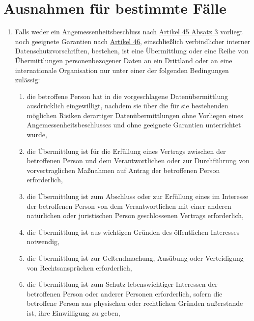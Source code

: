 \chapter{Ausnahmen für bestimmte Fälle}
\label{ch:49}


\begin{enumerate}

  \item Falls weder ein Angemessenheitsbeschluss nach \hyperref[itm:45-3]{Artikel 45 Absatz 3} vorliegt noch geeignete
   Garantien nach \hyperref[ch:46]{Artikel 46}, einschließlich verbindlicher interner Datenschutzvorschriften,
   bestehen, ist eine Übermittlung oder eine Reihe von Übermittlungen personenbezogener Daten an ein Drittland oder an
   eine internationale Organisation nur unter einer der folgenden Bedingungen zulässig:
  \label{itm:49-1-1}

  \begin{enumerate}
  
    \item die betroffene Person hat in die vorgeschlagene Datenübermittlung ausdrücklich eingewilligt, nachdem sie über
     die für sie bestehenden möglichen Risiken derartiger Datenübermittlungen ohne Vorliegen eines
     Angemessenheitsbeschlusses und ohne geeignete Garantien unterrichtet wurde,
    \label{itm:49-1-1a}

    \item die Übermittlung ist für die Erfüllung eines Vertrags zwischen der betroffenen Person und dem Verantwortlichen
     oder zur Durchführung von vorvertraglichen Maßnahmen auf Antrag der betroffenen Person erforderlich,
    \label{itm:49-1-1b}

    \item die Übermittlung ist zum Abschluss oder zur Erfüllung eines im Interesse der betroffenen Person von dem
     Verantwortlichen mit einer anderen natürlichen oder juristischen Person geschlossenen Vertrags erforderlich,
    \label{itm:49-1-1c}

    \item die Übermittlung ist aus wichtigen Gründen des öffentlichen Interesses notwendig,
    \label{itm:49-1-1d}

    \item die Übermittlung ist zur Geltendmachung, Ausübung oder Verteidigung von Rechtsansprüchen erforderlich,
    \label{itm:49-1-1e}

    \item die Übermittlung ist zum Schutz lebenswichtiger Interessen der betroffenen Person oder anderer Personen
     erforderlich, sofern die betroffene Person aus physischen oder rechtlichen Gründen außerstande ist, ihre
     Einwilligung zu geben,
    \label{itm:49-1-1f}


\end{enumerate}
\end{enumerate}
